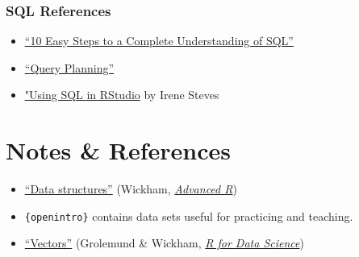 \documentclass[
]{book}
\newenvironment{Shaded}{\begin{snugshade}}{\end{snugshade}}
\newcommand{\CommentTok}[1]{\textcolor[rgb]{0.56,0.35,0.01}{\textit{#1}}}
\newcommand{\ControlFlowTok}[1]{\textcolor[rgb]{0.13,0.29,0.53}{\textbf{#1}}}
\newcommand{\FunctionTok}[1]{\textcolor[rgb]{0.00,0.00,0.00}{#1}}
\newcommand{\NormalTok}[1]{#1}
\newcommand{\OtherTok}[1]{\textcolor[rgb]{0.56,0.35,0.01}{#1}}
\newcommand{\SpecialCharTok}[1]{\textcolor[rgb]{0.00,0.00,0.00}{#1}}
\newcommand{\StringTok}[1]{\textcolor[rgb]{0.31,0.60,0.02}{#1}}
\providecommand{\tightlist}{%
  \setlength{\itemsep}{0pt}\setlength{\parskip}{0pt}}
\begin{document}
\begin{Shaded}
\end{Shaded}

\hypertarget{sql-references}{%
\subsubsection{SQL References}\label{sql-references}}

\begin{itemize}
\tightlist
\item
  \href{https://blog.jooq.org/2016/03/17/10-easy-steps-to-a-complete-understanding-of-sql/}{``10 Easy Steps to a Complete Understanding of SQL''}
\item
  \href{https://www.sqlite.org/queryplanner.html}{``Query Planning''}
\item
  \href{https://irene.rbind.io/post/using-sql-in-rstudio/}{"Using SQL in RStudio} by Irene Steves
\end{itemize}

\hypertarget{notes-references}{%
\section{Notes \& References}\label{notes-references}}

\begin{itemize}
\tightlist
\item
  \href{http://adv-r.had.co.nz/Data-structures.html}{``Data structures''} (Wickham, \href{http://adv-r.had.co.nz/}{\emph{Advanced R}})
\item
  \texttt{\{openintro\}} contains data sets useful for practicing and teaching.
\item
  \href{https://r4ds.had.co.nz/vectors.html}{``Vectors''} (Grolemund \& Wickham, \href{https://r4ds.had.co.nz/}{\emph{R for Data Science}})
\end{itemize}
\end{document}
